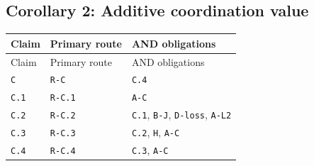 \documentclass[11pt,letterpaper]{article}
\begin{document}
{\subsection{Corollary 2: Additive coordination value}
\begin{longtable}{>{\raggedright\arraybackslash}p{.14\linewidth}>{\raggedright\arraybackslash}p{.21\linewidth}>{\raggedright\arraybackslash}p{.54\linewidth}}
\toprule
Claim & Primary route & AND obligations \\
\midrule\endfirsthead
\toprule
Claim & Primary route & AND obligations \\
\midrule\endhead
\bottomrule\endfoot
\texttt{C} & \texttt{R-C} & \texttt{C.4} \\[3pt]
\texttt{C.1} & \texttt{R-C.1} & \texttt{A-C} \\[3pt]
\texttt{C.2} & \texttt{R-C.2} & \texttt{C.1}, \texttt{B-J}, \texttt{D-loss}, \texttt{A-L2} \\[3pt]
\texttt{C.3} & \texttt{R-C.3} & \texttt{C.2}, \texttt{H}, \texttt{A-C} \\*[3pt]
\texttt{C.4} & \texttt{R-C.4} & \texttt{C.3}, \texttt{A-C} \\[3pt]
\end{longtable}
}
\end{document}
